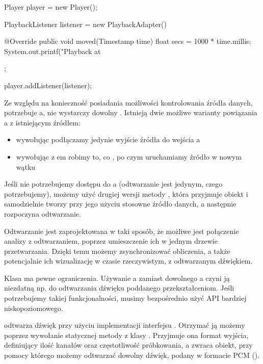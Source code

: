 \begin{java}
Player player = new Player();

PlaybackListener listener = new PlaybackAdapter() {

    @Override
    public void moved(Timestamp time) {
        float secs = 1000 * time.millis;
        System.out.printf("Playback at %
    }
};

player.addListener(listener);
\end{java}

Ze względu na konieczność posiadania możliwości kontrolowania źródła danych, 
potrzebuje a, nie wystarczy dowolny . Istnieją dwie możliwe
warianty powiązania a z istniejącym źródłem:

\begin{itemize}

  \item wywołując  podłączamy jedynie wyjście źródła do wejścia a

  \item wywołując  z em robimy to, co , po czym
    uruchamiamy źródło w nowym wątku

\end{itemize}

Jeśli nie potrzebujemy dostępu do a (odtwarzanie jest jedynym, czego
potrzebujemy), możemy użyć drugiej wersji metody , która przyjmuje obiekt
 i samodzielnie tworzy przy jego użyciu stosowne źródło danych, a następnie
rozpoczyna odtwarzanie.

\begin{Tip}
Odtwarzanie jest zaprojektowana w taki sposób, że możliwe jest połączenie analizy z odtwarzaniem,
poprzez umieszczenie ich w jednym drzewie przetwarzania. Dzięki temu możemy zsynchronizować
obliczenia, a także potencjalnie ich wizualizację w czasie rzeczywistym, z odtwarzanym dźwiękiem.
\end{Tip}

Klasa  ma pewne ograniczenia. Używanie a zamiast dowolnego
a czyni ją niezdatną np. do odtwarzania dźwięku poddanego przekształceniom. Jeśli
potrzebujemy takiej funkcjonalności, musimy bezpośrednio użyć API bardziej niskopoziomowego.

 odtwarza dźwięk przy użyciu implementacji interfejsu . Otrzymać ją
możemy poprzez wywołanie statycznej metody  z klasy . Przyjmuje ona
format wyjścia, definiujący ilość kanałów oraz częstotliwość próbkowania, a zwraca obiekt, przy
pomocy którego możemy odtwarzać dowolny dźwięk, podany w formacie PCM ().

